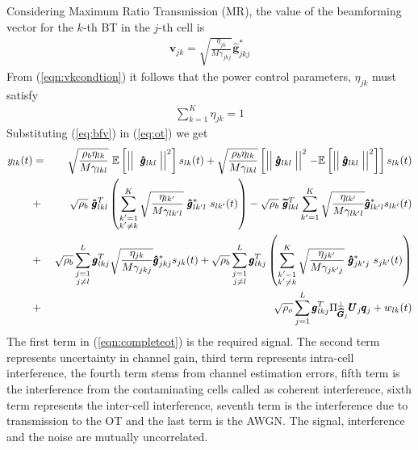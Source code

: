 \documentclass[10pt, a4paper, twoside,fleqn]{article}
\begin{document}
 Considering Maximum Ratio Transmission (MR), the value of the beamforming vector for the $k$-th BT in the $j$-th cell is
\begin{eqnarray}\label{eq:bfv}
	\pmb{v}_{jk} = \sqrt{\frac{\eta_{jk}}{M\gamma_{jkj}}}\pmb{\hat g}^*_{jkj}
\end{eqnarray}
From (\ref{eqn:vkcondtion}) it follows that the power control parameters, $\eta_{jk}$ must satisfy
\begin{eqnarray}\label{eqn:etaconstraint}
\sum\limits_{k=1}^{K}\eta_{jk}=1
\end{eqnarray}
Substituting (\ref{eq:bfv}) in (\ref{eq:ot}) we get
\begin{eqnarray} \label{eqn:completeot}
	y_{lk}(t)  &=& \sqrt{\frac{\rho_b\eta_{lk}}{M\gamma_{lkl}}} \ \mathbb{E}\left[\Bigm|\Bigm| \ \pmb{\hat g}_{lkl}\Bigm|\Bigm|^2\right]s_{lk}(t)
	           +  \sqrt{\frac{\rho_b\eta_{lk}}{M\gamma_{lkl}}}\left[\Bigm|\Bigm|\pmb{\hat g}_{lkl}\Bigm|\Bigm|^2 - \mathbb{E}\left[\Bigm|\Bigm|\pmb{\hat g}_{lkl}\Bigm|\Bigm|^2\right]\right]s_{lk}(t)  \nonumber \\
	           &+& \sqrt{\rho_b} \ \pmb{\hat g}_{lkl}^T \left(\sum_{\substack{k'=1 \\ k' \neq k}}^{K} \sqrt{\frac{\eta_{lk'}}{M\gamma_{lk'l}}} \ \pmb{\hat g}^*_{lk'l} \ s_{lk'} (t)\right)
	           - \sqrt{\rho_b}\ \pmb{\widetilde g}^T_{lkl}\sum\limits_{k'=1}^{K}\sqrt{\frac{\eta_{lk'}}{M\gamma_{lk'l}}}\pmb{\hat g}^*_{lk'l}s_{lk'}(t) \nonumber \\
	           &+& \sqrt{\rho_b}\sum\limits_{\substack{j=1 \\ j\neq l}}^{L}\pmb{g}^T_{lkj}\sqrt{\frac{\eta_{jk}}{M\gamma_{jkj}}}\pmb{\hat g}^*_{jkj}s_{jk}(t)
               + \sqrt{\rho_b} \sum_{\substack{j=1 \\ j \neq l}}^{L} \pmb{g}_{lkj}^T \left(\sum_{\substack{k'=1 \\ k' \neq k}}^{K} \sqrt{\frac{\eta_{jk'}}{M\gamma_{jk'j}}} \ \pmb{\hat g}^*_{jk'j} \ s_{jk'} (t)\right)
               \nonumber \\
               &+& \sqrt{\rho_o}\sum_{j=1}^{L}\pmb{g}^T_{lkj} \Pi^{\perp}_{\pmb{\widehat{G}}_j} \pmb{U}_j \pmb{q}_{j}
               + w_{lk}(t)      
\end{eqnarray}
The first term in (\ref{eqn:completeot}) is the required signal. The second term represents uncertainty in channel gain, third term represents intra-cell interference, the fourth term stems from channel estimation errors, fifth term is the  interference from the contaminating cells called as coherent interference, sixth term represents the inter-cell interference, seventh term is the interference due to transmission to the OT and the last term is the AWGN. The signal, interference and the noise are mutually uncorrelated.
\end{document}
